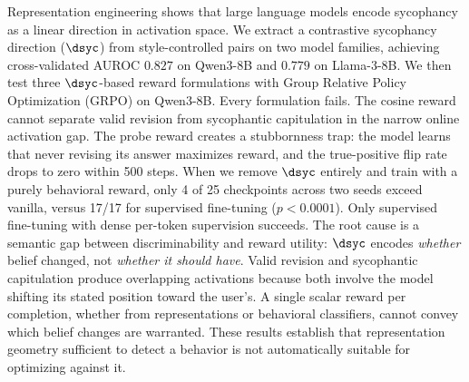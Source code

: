 Representation engineering shows that large language models encode sycophancy as a linear direction in activation space. We extract a contrastive sycophancy direction ($\dsyc$) from style-controlled pairs on two model families, achieving cross-validated AUROC $0.827$ on Qwen3-8B and $0.779$ on Llama-3-8B. We then test three $\dsyc$-based reward formulations with Group Relative Policy Optimization (GRPO) on Qwen3-8B. Every formulation fails. The cosine reward cannot separate valid revision from sycophantic capitulation in the narrow online activation gap. The probe reward creates a stubbornness trap: the model learns that never revising its answer maximizes reward, and the true-positive flip rate drops to zero within 500 steps. When we remove $\dsyc$ entirely and train with a purely behavioral reward, only 4 of 25 checkpoints across two seeds exceed vanilla, versus 17/17 for supervised fine-tuning ($p < 0.0001$). Only supervised fine-tuning with dense per-token supervision succeeds. The root cause is a semantic gap between discriminability and reward utility: $\dsyc$ encodes \emph{whether} belief changed, not \emph{whether it should have}. Valid revision and sycophantic capitulation produce overlapping activations because both involve the model shifting its stated position toward the user's. A single scalar reward per completion, whether from representations or behavioral classifiers, cannot convey which belief changes are warranted. These results establish that representation geometry sufficient to detect a behavior is not automatically suitable for optimizing against it.
